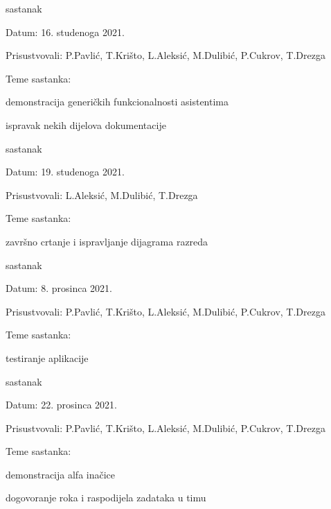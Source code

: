 \begin{packed_enum}
			\item  sastanak
			\item[] \begin{packed_item}
				\item Datum: 16. studenoga 2021.
				\item Prisustvovali: P.Pavlić, T.Krišto, L.Aleksić, M.Dulibić, P.Cukrov, T.Drezga
				\item Teme sastanka:
				\begin{packed_item}
					\item demonstracija generičkih funkcionalnosti asistentima
					\item ispravak nekih dijelova dokumentacije
				\end{packed_item}
			\end{packed_item}
			
			\item  sastanak
			\item[] \begin{packed_item}
				\item Datum: 19. studenoga 2021.
				\item Prisustvovali: L.Aleksić, M.Dulibić, T.Drezga
				\item Teme sastanka:
				\begin{packed_item}
					\item završno crtanje i ispravljanje dijagrama razreda
				\end{packed_item}
			\end{packed_item}
			
			\item  sastanak
			\item[] \begin{packed_item}
				\item Datum: 8. prosinca 2021.
				\item Prisustvovali: P.Pavlić, T.Krišto, L.Aleksić, M.Dulibić, P.Cukrov, T.Drezga
				\item Teme sastanka:
				\begin{packed_item}
					\item testiranje aplikacije
				\end{packed_item}
			\end{packed_item}
						
			\item  sastanak
			\item[] \begin{packed_item}
				\item Datum: 22. prosinca 2021.
				\item Prisustvovali: P.Pavlić, T.Krišto, L.Aleksić, M.Dulibić, P.Cukrov, T.Drezga
				\item Teme sastanka:
				\begin{packed_item}
					\item demonstracija alfa inačice
					\item dogovoranje roka i raspodijela zadataka u timu
				\end{packed_item}
			\end{packed_item}
			
		\end{packed_enum}
		
